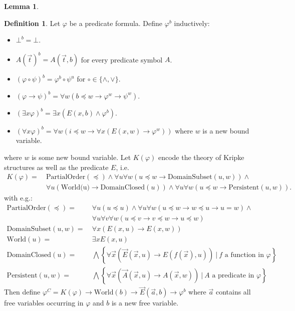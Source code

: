 \documentclass{easychair}
\theoremstyle{definition}
\theoremstyle{definition}
\theoremstyle{definition}
\newtheorem{lemma}[theorem]{Lemma}
\theoremstyle{definition}
\theoremstyle{definition}
\newtheorem{definition}[theorem]{Definition}
\theoremstyle{definition}
\theoremstyle{definition}
\begin{document}
\begin{lemma}
\begin{definition}\label{def:fo-translation}
	Let $\varphi$ be a predicate formula. Define $\varphi^{b}$ inductively:
	\begin{itemize}
		\item $\bot^b = \bot$.
		\item $A(\vec t)^{b} = A(\vec t, b)$ for every predicate symbol $A$.
		\item $(\varphi\circ\psi)^b = \varphi^b\circ\psi^u$ for $\circ\in\{\wedge, \vee\}$.
		\item $(\varphi\to \psi)^b = \forall w(b\preceq w\to\varphi^{w}\to\psi^{w})$.
		\item $(\exists x\varphi)^b = \exists x(E(x,b)\wedge\varphi^b)$.
		\item $(\forall x\varphi)^b = \forall w(i\preceq w\to \forall x(E(x, w)\to \varphi^w))$ where $w$ is a new bound variable.
	\end{itemize}
	where $w$ is some new bound variable. Let $K(\varphi)$ encode the theory of Kripke structures as well as the predicate $E$, i.e.
	\begin{align*}
		K(\varphi) = \:& \text{PartialOrder}(\preceq) \wedge \forall u \forall w (u\preceq w\to \text{DomainSubset}(u, w)) \wedge\\
		& \forall u(\text{World(u)}\to \text{DomainClosed}(u))\wedge \forall u\forall w (u\preceq w\to \text{Persistent}(u, w)).
	\end{align*}
	with e.g.:\vspace*{-.76cm}
	\begin{align*}
		\text{PartialOrder}(\preceq) = &\:\forall u(u\preceq u)\wedge\forall u\forall w(u\preceq w\to w\preceq u\to u = w)\wedge\\&\:\forall u\forall v\forall w(u\preceq v\to v\preceq w\to u\preceq w)\\
		\text{DomainSubset}(u, w) = &\:\forall x(E(x, u)\to E(x, w))\\
		\text{World}(u) = &\:\exists xE(x, u)\\
		\text{DomainClosed}(u) = &\:\bigwedge\left\{\forall\vec x(\vec E(\vec x, u)\to E(f(\vec x), u))\:|\:\text{$f$ a function in $\varphi$}\right\}\\
		\text{Persistent}(u, w) = &\:\bigwedge\left\{\forall\vec x(\vec A(\vec x, u)\to A(\vec x, w))\:|\:\text{$A$ a predicate in $\varphi$}\right\}
	\end{align*}
	Then define
	$\varphi^C = K(\varphi)\to\text{World}(b)\to \vec E(\vec a, b)\to \varphi^b$ where $\vec a$ contains all free variables occurring in $\varphi$ and $b$ is a new free variable.
\end{definition}


\end{lemma}
\end{document}
